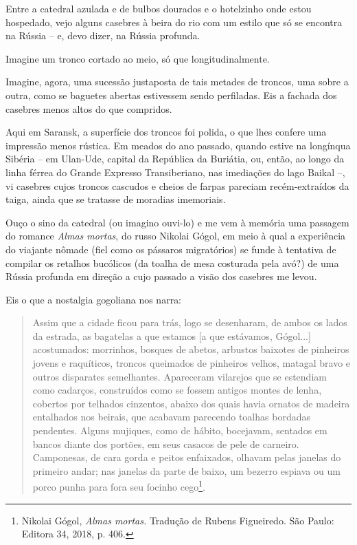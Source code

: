 Entre a catedral azulada e de bulbos dourados e o hotelzinho onde estou
hospedado, vejo alguns casebres à beira do rio com um estilo que só se
encontra na Rússia -- e, devo dizer, na Rússia profunda.

Imagine um tronco cortado ao meio, só que longitudinalmente.

Imagine, agora, uma sucessão justaposta de tais metades de troncos, uma
sobre a outra, como se baguetes abertas estivessem sendo perfiladas. Eis
a fachada dos casebres menos altos do que compridos.

Aqui em Saransk, a superfície dos troncos foi polida, o que lhes confere
uma impressão menos rústica. Em meados do ano passado, quando estive na
longínqua Sibéria -- em Ulan-Ude, capital da República da Buriátia, ou,
então, ao longo da linha férrea do Grande Expresso Transiberiano, nas
imediações do lago Baikal --, vi casebres cujos troncos cascudos e
cheios de farpas pareciam recém-extraídos da taiga, ainda que se
tratasse de moradias imemoriais.

Ouço o sino da catedral (ou imagino ouvi-lo) e me vem à memória uma
passagem do romance \emph{Almas mortas}, do russo Nikolai Gógol, em meio
à qual a experiência do viajante nômade (fiel como os pássaros
migratórios) se funde à tentativa de compilar os retalhos bucólicos (da
toalha de mesa costurada pela avó?) de uma Rússia profunda em direção a
cujo passado a visão dos casebres me levou.

Eis o que a nostalgia gogoliana nos narra:

\begin{quote}
Assim que a cidade ficou para trás, logo se desenharam, de ambos os
lados da estrada, as bagatelas a que estamos {[}a que estávamos,
Gógol...{]} acostumados: morrinhos, bosques de abetos, arbustos baixotes
de pinheiros jovens e raquíticos, troncos queimados de pinheiros velhos,
matagal bravo e outros disparates semelhantes. Apareceram vilarejos que
se estendiam como cadarços, construídos como se fossem antigos montes de
lenha, cobertos por telhados cinzentos, abaixo dos quais havia ornatos
de madeira entalhados nos beirais, que acabavam parecendo toalhas
bordadas pendentes. Alguns mujiques, como de hábito, bocejavam, sentados
em bancos diante dos portões, em seus casacos de pele de carneiro.
Camponesas, de cara gorda e peitos enfaixados, olhavam pelas janelas do
primeiro andar; nas janelas da parte de baixo, um bezerro espiava ou um
porco punha para fora seu focinho cego\footnote{Nikolai Gógol,
  \emph{Almas mortas.} Tradução de Rubens Figueiredo. São Paulo: Editora
  34, 2018, p. 406.}.
\end{quote}

